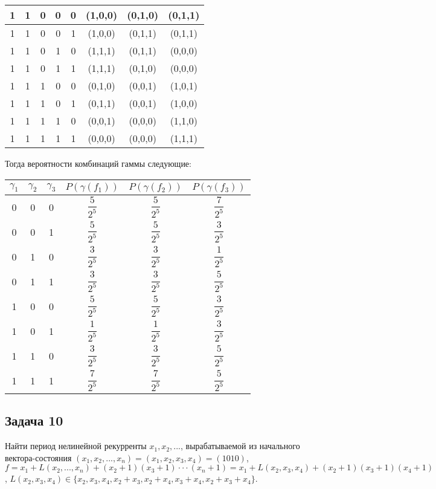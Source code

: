 \documentclass[utf8x, 14pt]{G7-32} %
\begin{document}
\begin{center}
\begin{tabular} { | c | c | c | c | c | c | c | c | }
\hline
1 & 1 & 0 & 0 & 0 & (1,0,0) & (0,1,0) & (0,1,1) \\
\hline
1 & 1 & 0 & 0 & 1 & (1,0,0) & (0,1,1) & (0,1,1) \\
\hline
1 & 1 & 0 & 1 & 0 & (1,1,1) & (0,1,1) & (0,0,0) \\
\hline
1 & 1 & 0 & 1 & 1 & (1,1,1) & (0,1,0) & (0,0,0) \\
\hline
1 & 1 & 1 & 0 & 0 & (0,1,0) & (0,0,1) & (1,0,1) \\
\hline
1 & 1 & 1 & 0 & 1 & (0,1,1) & (0,0,1) & (1,0,0) \\
\hline
1 & 1 & 1 & 1 & 0 & (0,0,1) & (0,0,0) & (1,1,0) \\
\hline
1 & 1 & 1 & 1 & 1 & (0,0,0) & (0,0,0) & (1,1,1) \\
\hline
\end{tabular}
\end{center}

Тогда вероятности комбинаций гаммы следующие:
\renewcommand{\arraystretch}{2} %
\begin{center}
\begin{tabular} { | c | c | c | c | c | c | }
\hline
$\gamma_1$ & $\gamma_2$ & $\gamma_3$ & $P(\gamma(f_1))$ & $P(\gamma(f_2))$ & $P(\gamma(f_3))$ \\
\hline\hline
0 & 0 & 0 & $\dfrac{5}{2^5}$ & $\dfrac{5}{2^5}$ & $\dfrac{7}{2^5}$ \\
\hline
0 & 0 & 1 & $\dfrac{5}{2^5}$ & $\dfrac{5}{2^5}$ & $\dfrac{3}{2^5}$ \\
\hline
0 & 1 & 0 & $\dfrac{3}{2^5}$ & $\dfrac{3}{2^5}$ & $\dfrac{1}{2^5}$ \\
\hline
0 & 1 & 1 & $\dfrac{3}{2^5}$ & $\dfrac{3}{2^5}$ & $\dfrac{5}{2^5}$ \\
\hline
1 & 0 & 0 & $\dfrac{5}{2^5}$ & $\dfrac{5}{2^5}$ & $\dfrac{3}{2^5}$ \\
\hline
1 & 0 & 1 & $\dfrac{1}{2^5}$ & $\dfrac{1}{2^5}$ & $\dfrac{3}{2^5}$ \\
\hline
1 & 1 & 0 & $\dfrac{3}{2^5}$ & $\dfrac{3}{2^5}$ & $\dfrac{5}{2^5}$ \\
\hline
1 & 1 & 1 & $\dfrac{7}{2^5}$ & $\dfrac{7}{2^5}$ & $\dfrac{5}{2^5}$ \\
\hline
\end{tabular}
\end{center}

\subsection{Задача 10}
Найти период нелинейной рекурренты $x_1,x_2,...$, вырабатываемой из начального вектора-состояния $(x_1,x_2,...,x_n)= (x_1,x_2,x_3,x_4)=(1010)$, $f=x_1+L(x_2,...,x_n)+(x_2+1)(x_3+1)\cdot\cdot\cdot(x_n+1) = x_1+ L(x_2,x_3,x_4)+(x_2+1)(x_3+1)(x_4+1)$, $L(x_2,x_3,x_4)\in\{x_2,x_3,x_4,x_2+x_3,x_2+x_4,x_3+x_4,x_2+x_3+x_4\}$.
\end{document}
